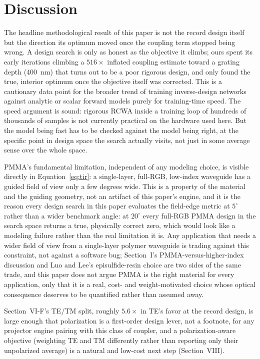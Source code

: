 \documentclass[10pt,twocolumn]{article}
\begin{document}
\section{Discussion}

The headline methodological result of this paper is not the record design
itself but the direction its optimum moved once the coupling term stopped
being wrong. A design search is only as honest as the objective it climbs;
ours spent its early iterations climbing a $5$\textendash$16\times$
inflated coupling estimate toward a grating depth (400~nm) that turns out
to be a poor rigorous design, and only found the true, interior optimum
once the objective itself was corrected. This is a cautionary data point
for the broader trend of training inverse-design networks against
analytic or scalar forward models purely for training-time speed. The
speed argument is sound: rigorous RCWA inside a training loop
of hundreds of thousands of samples is not currently practical on the
hardware used here. But the model being fast has to be
checked against the model being right, at the specific point in
design space the search actually visits, not just in some average sense
over the whole space.

PMMA's fundamental limitation, independent of any modeling choice, is
visible directly in Equation~\eqref{eq:tir}: a single-layer, full-RGB,
low-index waveguide has a guided field of view only a few degrees wide.
This is a property of the material and the guiding geometry, not an
artifact of this paper's engine, and it is the reason every design search
in this paper evaluates the field-edge metric at $5^\circ$ rather than a
wider benchmark angle: at $20^\circ$ every full-RGB PMMA
design in the search space returns a true, physically correct zero, which
would look like a modeling failure rather than the real limitation it is.
Any application that needs a wider field of view from a single-layer
polymer waveguide is trading against this constraint, not against a
software bug; Section~I's PMMA-versus-higher-index discussion and
Luo and Lee's episulfide-resin choice \cite{luo2024} are two sides of the
same trade, and this paper does not argue PMMA is the right material for
every application, only that it is a real, cost- and weight-motivated
choice whose optical consequence deserves to be quantified rather than
assumed away.

Section~VI-F's TE/TM split, roughly $5.6\times$ in TE's favor at the
record design, is large enough that polarization is a first-order design
lever, not a footnote, for any projector engine pairing with this class of
coupler, and a polarization-aware objective (weighting TE and TM
differently rather than reporting only their unpolarized average) is a
natural and low-cost next step (Section~VIII).
\end{document}
